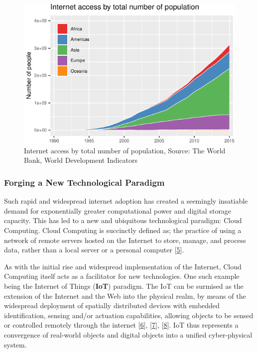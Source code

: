 \documentclass[11pt,]{article}
\begin{document}
\begin{figure}[H]

{\centering \includegraphics{MD_Final_files/figure-latex/internetAccessPlot-1} 

}

\caption{Internet access by total number of population, Source: The World Bank, World Development Indicators}\label{fig:internetAccessPlot}
\end{figure}

\hypertarget{forging-a-new-technological-paradigm}{%
\subsubsection{Forging a New Technological
Paradigm}\label{forging-a-new-technological-paradigm}}

Such rapid and widespread internet adoption has created a seemingly
insatiable demand for exponentially greater computational power and
digital storage capacity. This has led to a new and ubiquitous
technological paradigm: Cloud Computing. Cloud Computing is succinctly
defined as; the practice of using a network of remote servers hosted on
the Internet to store, manage, and process data, rather than a local
server or a personal computer
{[}\protect\hyperlink{ref-CloudComputingDefinition}{5}{]}.

As with the initial rise and widespread implementation of the Internet,
Cloud Computing itself acts as a facilitator for new technologies. One
such example being the Internet of Things (\textbf{IoT}) paradigm. The
IoT can be surmised as the extension of the Internet and the Web into
the physical realm, by means of the widespread deployment of spatially
distributed devices with embedded identification, sensing and/or
actuation capabilities, allowing objects to be sensed or controlled
remotely through the internet
{[}\protect\hyperlink{ref-danielemiorandiInternetThingsVision2012}{6}{]},
{[}\protect\hyperlink{ref-binghuangServiceOrientedComputing16th2018}{7}{]},
{[}\protect\hyperlink{ref-luigiatzoriInternetThingsSurvey2010}{8}{]}.
IoT thus represents a convergence of real-world objects and digital
objects into a unified cyber-physical system.
\end{document}
